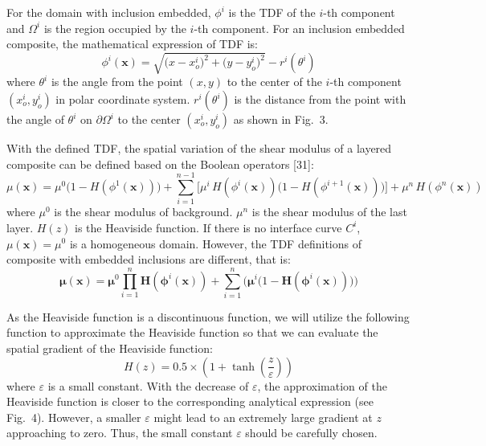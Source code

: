 \documentclass[11pt]{article}
\begin{document}
For the domain with inclusion embedded, $\phi^i$ is the TDF of the
$i$-th component and $\Omega^i$ is the region occupied by the $i$-th
component. For an inclusion embedded composite, the mathematical
expression of TDF is:
\begin{equation}
\phi^i(\mathbf{x}) = \sqrt{\bigl(x - x_o^i\bigr)^{2}
                           + \bigl(y - y_o^i\bigr)^{2}}
                     - r^i\!\left(\theta^i\right)
\end{equation}
where $\theta^i$ is the angle from the point $(x, y)$ to the center
of the $i$-th component $\left(x_o^i, y_o^i\right)$ in polar
coordinate system. $r^i(\theta^i)$ is the distance from the point
with the angle of $\theta^i$ on $\partial\Omega^i$ to the center
$\left(x_o^i, y_o^i\right)$ as shown in Fig.~3.

With the defined TDF, the spatial variation of the shear modulus of
a layered composite can be defined based on the Boolean operators
[31]:
\begin{equation}
\mu(\mathbf{x}) = \mu^{0}\bigl(1 - H(\phi^{1}(\mathbf{x}))\bigr)
+ \sum_{i=1}^{n-1}\!\bigl[\mu^{i}\, H(\phi^{i}(\mathbf{x}))
                           \bigl(1 - H(\phi^{i+1}(\mathbf{x}))\bigr)\bigr]
+ \mu^{n}\, H(\phi^{n}(\mathbf{x}))
\end{equation}
where $\mu^{0}$ is the shear modulus of background. $\mu^{n}$ is the
shear modulus of the last layer. $H(z)$ is the Heaviside function.
If there is no interface curve $C^i$, $\mu(\mathbf{x}) = \mu^{0}$ is
a homogeneous domain. However, the TDF definitions of composite with
embedded inclusions are different, that is:
\begin{equation}
\boldsymbol{\mu}\!\left(\boldsymbol{x}\right) =
\boldsymbol{\mu}^{0} \prod_{i=1}^{n}
  \mathbf{H}\!\left(\boldsymbol{\phi}^{i}(\boldsymbol{x})\right)
+ \sum_{i=1}^{n}\!\bigl(\boldsymbol{\mu}^{i}
  \bigl(1 - \mathbf{H}(\boldsymbol{\phi}^{i}(\boldsymbol{x}))\bigr)\bigr)
\end{equation}

As the Heaviside function is a discontinuous function, we will
utilize the following function to approximate the Heaviside function
so that we can evaluate the spatial gradient of the Heaviside
function:
\begin{equation}
H(z) = 0.5 \times \left(1 + \tanh\!\left(\dfrac{z}{\varepsilon}\right)\right)
\end{equation}
where $\varepsilon$ is a small constant. With the decrease of
$\varepsilon$, the approximation of the Heaviside function is closer
to the corresponding analytical expression (see Fig.~4). However, a
smaller $\varepsilon$ might lead to an extremely large gradient at
$z$ approaching to zero. Thus, the small constant $\varepsilon$
should be carefully chosen.
\end{document}
